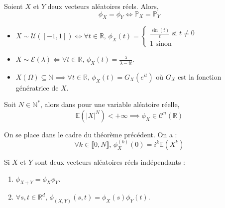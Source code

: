 
  \begin{theorem}
    Soient $X$ et $Y$ deux vecteurs aléatoires réels. Alors,
    \[ \phi_X = \phi_Y \iff \mathbb{P}_X = \mathbb{P}_Y \]
  \end{theorem}

  \begin{example}
    \begin{itemize}
      \item $X \sim \mathcal{U}([-1, 1]) \iff \forall t \in \mathbb{R}, \, \phi_X(t) = \begin{cases}
        \frac{\sin(t)}{t} \text{ si } t \neq 0 \\
        1 \text{ sinon}
      \end{cases}$
      \item $X \sim \mathcal{E}(\lambda) \iff \forall t \in \mathbb{R}, \, \phi_X(t) = \frac{\lambda}{\lambda-it}$.
      \item $X(\Omega) \subseteq \mathbb{N} \implies \forall t \in \mathbb{R}, \, \phi_X(t) = G_X(e^{it})$ où $G_X$ est la fonction génératrice de $X$.
    \end{itemize}
  \end{example}

  \begin{theorem}
    Soit $N \in \mathbb{N}^*$, alors dans pour une variable aléatoire réelle,
    \[ \mathbb{E}(\vert X \vert^N) < +\infty \implies \phi_X \in \mathcal{C}^n(\mathbb{R}) \]
  \end{theorem}

  \begin{corollary}
    On se place dans le cadre du théorème précédent. On a :
    \[ \forall k \in \llbracket 0, N \rrbracket, \, \phi_X^{(k)} (0) = i^k \mathbb{E}(X^k) \]
  \end{corollary}

  \begin{theorem}
    Si $X$ et $Y$ sont deux vecteurs aléatoires réels indépendants :
    \begin{enumerate}[label={\bfseries(\roman*)}]
      \item $\phi_{X+Y} = \phi_X \phi_Y$.
      \item $\forall s, t \in \mathbb{R}^d, \, \phi_{(X,Y)}(s,t) = \phi_X(s) \phi_Y(t)$.
    \end{enumerate}
  \end{theorem}

